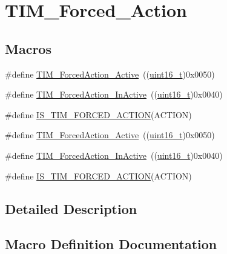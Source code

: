 \hypertarget{group___t_i_m___forced___action}{}\section{T\+I\+M\+\_\+\+Forced\+\_\+\+Action}
\label{group___t_i_m___forced___action}
\subsection*{Macros}
\begin{DoxyCompactItemize}
\item 
\#define \hyperlink{group___t_i_m___forced___action_ga19d3769825f1dfdbdbde3edb60310b99}{T\+I\+M\+\_\+\+Forced\+Action\+\_\+\+Active}~((\hyperlink{_p_e___types_8h_a1f1825b69244eb3ad2c7165ddc99c956}{uint16\+\_\+t})0x0050)
\item 
\#define \hyperlink{group___t_i_m___forced___action_ga79656f2193ec5e12a15d0ae5b025d273}{T\+I\+M\+\_\+\+Forced\+Action\+\_\+\+In\+Active}~((\hyperlink{_p_e___types_8h_a1f1825b69244eb3ad2c7165ddc99c956}{uint16\+\_\+t})0x0040)
\item 
\#define \hyperlink{group___t_i_m___forced___action_gaa2cb16f281d32c95ab974dc5157bfa63}{I\+S\+\_\+\+T\+I\+M\+\_\+\+F\+O\+R\+C\+E\+D\+\_\+\+A\+C\+T\+I\+ON}(A\+C\+T\+I\+ON)
\item 
\#define \hyperlink{group___t_i_m___forced___action_ga19d3769825f1dfdbdbde3edb60310b99}{T\+I\+M\+\_\+\+Forced\+Action\+\_\+\+Active}~((\hyperlink{_p_e___types_8h_a1f1825b69244eb3ad2c7165ddc99c956}{uint16\+\_\+t})0x0050)
\item 
\#define \hyperlink{group___t_i_m___forced___action_ga79656f2193ec5e12a15d0ae5b025d273}{T\+I\+M\+\_\+\+Forced\+Action\+\_\+\+In\+Active}~((\hyperlink{_p_e___types_8h_a1f1825b69244eb3ad2c7165ddc99c956}{uint16\+\_\+t})0x0040)
\item 
\#define \hyperlink{group___t_i_m___forced___action_gaa2cb16f281d32c95ab974dc5157bfa63}{I\+S\+\_\+\+T\+I\+M\+\_\+\+F\+O\+R\+C\+E\+D\+\_\+\+A\+C\+T\+I\+ON}(A\+C\+T\+I\+ON)
\end{DoxyCompactItemize}


\subsection{Detailed Description}


\subsection{Macro Definition Documentation}
